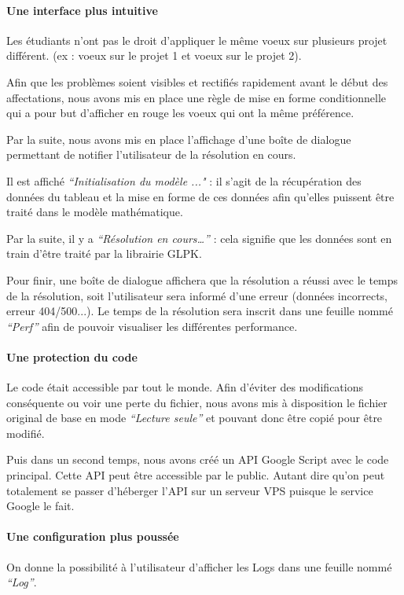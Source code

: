 \documentclass[final,poster]{polytech/polytech}
\begin{document}
\paragraph{Une interface plus intuitive}
Les étudiants n'ont pas le droit d'appliquer le même voeux sur plusieurs projet différent. (ex : voeux  sur le projet 1 et voeux  sur le projet 2).

Afin que les problèmes soient visibles et rectifiés rapidement avant le début des affectations, nous avons mis en place une règle de mise en forme conditionnelle qui a pour but d'afficher en rouge les voeux qui ont la même préférence.

Par la suite, nous avons mis en place l'affichage d'une boîte de dialogue permettant de notifier l'utilisateur de la résolution en cours.

 Il est affiché\textit{ “Initialisation du modèle ..."} : il s'agit de la récupération des données du tableau et la mise en forme de ces données afin qu'elles puissent être traité dans le modèle mathématique.
 
Par la suite, il y a \textit{“Résolution en cours…”} : cela signifie que les données sont en train d'être traité par la librairie GLPK.

Pour finir, une boîte de dialogue affichera que la résolution a réussi avec le temps de la résolution, soit l'utilisateur sera informé d'une erreur (données incorrects, erreur 404/500...). Le temps de la résolution sera inscrit dans une feuille nommé \textit{“Perf”} afin de pouvoir visualiser les différentes performance.

\paragraph{Une protection du code}
Le code était accessible par tout le monde. Afin d'éviter des modifications conséquente ou voir une perte du fichier, nous avons mis à disposition le fichier original de base en mode \textit{“Lecture seule”} et pouvant donc être copié pour être modifié. 

Puis dans un second temps, nous avons créé un API Google Script avec le code principal. Cette API peut être accessible par le public. Autant dire qu'on peut totalement se passer d'héberger l'API sur un serveur VPS puisque le service Google le fait.

\paragraph{Une configuration plus poussée}
On donne la possibilité à l'utilisateur d'afficher les Logs dans une feuille nommé \textit{“Log”}.
\end{document}
